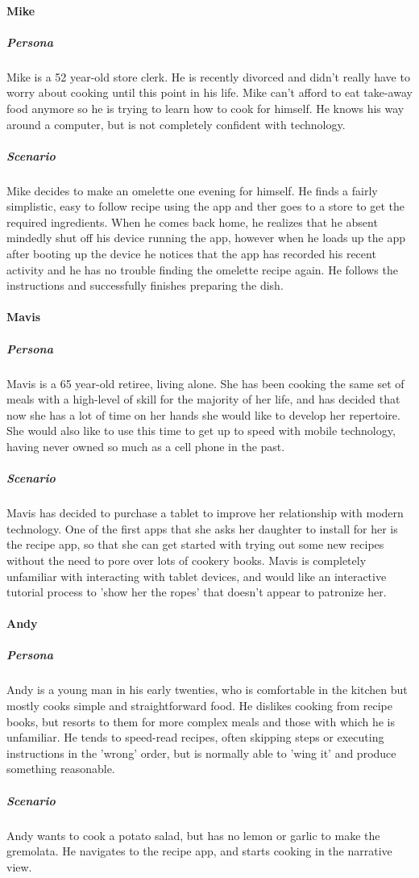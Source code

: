 \paragraph{Mike}
\subparagraph{Persona}
Mike is a 52 year-old store clerk. He is recently divorced and didn't really have
to worry about cooking until this point in his life. Mike can't afford to eat
take-away food anymore so he is trying to learn how to cook for himself. He knows
his way around a computer, but is not completely confident with technology.
\subparagraph{Scenario}
Mike decides to make an omelette one evening for himself. He finds a fairly 
simplistic, easy to follow recipe using the app and ther goes to a store to get
the required ingredients. When he comes back home, he realizes that he absent
mindedly shut off his device running the app, however when he loads up the 
app after booting up the device he notices that the app has recorded his 
recent activity and he has no trouble finding the omelette recipe again. He
follows the instructions and successfully finishes preparing the dish.

\paragraph{Mavis}
\subparagraph{Persona}
Mavis is a 65 year-old retiree, living alone. She has been cooking the same set 
of meals with a high-level of skill for the majority of her life, and has
decided that now she has a lot of time on her hands she would like to develop
her repertoire. She would also like to use this time to get up to speed with 
mobile technology, having never owned so much as a cell phone in the past.
\subparagraph{Scenario}
Mavis has decided to purchase a tablet to improve her relationship with modern
technology. One of the first apps that she asks her daughter to install for her
is the recipe app, so that she can get started with trying out some new recipes
without the need to pore over lots of cookery books. Mavis is completely 
unfamiliar with interacting with tablet devices, and would like an interactive 
tutorial process to 'show her the ropes' that doesn't appear to patronize her.

\paragraph{Andy}
\subparagraph{Persona}
Andy is a young man in his early twenties, who is comfortable in the kitchen but
mostly cooks simple and straightforward food. He dislikes cooking from recipe
books, but resorts to them for more complex meals and those with which he is
unfamiliar. He tends to speed-read recipes, often skipping steps or executing
instructions in the 'wrong' order, but is normally able to 'wing it' and produce
something reasonable.
\subparagraph{Scenario}
Andy wants to cook a potato salad, but has no lemon or garlic to make the
gremolata. He navigates to the recipe app, and starts cooking in the narrative
view.

